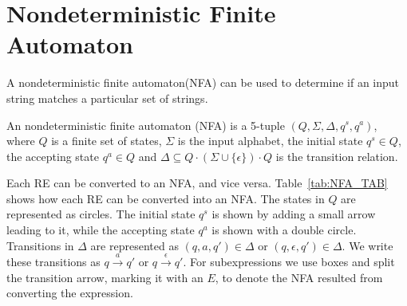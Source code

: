 \section{Nondeterministic Finite Automaton}\label{RA_TO_NFA}
A nondeterministic finite automaton(NFA) can be used to determine if an input string matches a particular set of strings.
\begin{mydef}
An nondeterministic finite automaton (NFA) is a 5-tuple $(Q,\Sigma,\Delta,q^s ,q^a)$, where $Q$ is a finite set of states, $\Sigma$ is the input alphabet, the initial state $q^s \in Q$,  the accepting state $q^a \in Q$ and $\Delta \subseteq Q \cdot (\Sigma \cup \{\epsilon\}) \cdot Q$ is the transition relation. 
\end{mydef}
Each RE can be converted to an NFA, and vice versa. Table~\ref{tab:NFA_TAB} shows how each RE can be converted into an NFA. The states in $Q$ are represented as circles. The initial state $q^s$ is shown by adding a small arrow leading to it, while the accepting state $q^a$ is shown with a double circle. Transitions in $\Delta$ are represented as  $(q,a,q')\in \Delta$ or $(q,\epsilon ,q')\in\Delta$. We write these transitions as $q \xrightarrow{a} q'$ or $q \xrightarrow{\epsilon} q'$. For subexpressions we use boxes and split the transition arrow, marking it with an $E$, to denote the NFA resulted from converting the expression. 

